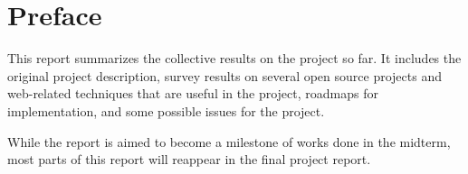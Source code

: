 \section{Preface}
\label{ch1}

This report summarizes the collective results on the project so far.
It includes the original project description, survey results on several open source projects and web-related techniques that are useful in the project, roadmaps for implementation, and some possible issues for the project.

While the report is aimed to become a milestone of works done in the midterm, most parts of this report will reappear in the final project report.
